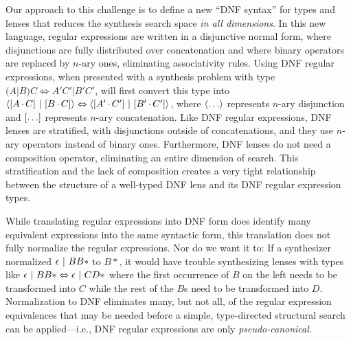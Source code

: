 \documentclass[acmsmall]{acmart}
\begin{document}
Our approach to this challenge is to define a new ``DNF syntax'' for types
and lenses that reduces the synthesis search space \emph{in all dimensions}.
In this new language, regular expressions are written in a disjunctive normal
form, where disjunctions are fully distributed over concatenation and where binary
operators are replaced by $n$-ary ones, eliminating associativity rules.
Using DNF regular expressions, when presented with a synthesis problem with type
$(A | B) C \Leftrightarrow A' C' | B' C'$, \Optician{} will first convert this
type into $\langle[ A \mkern-1mu\cdot\mkern-1mu C] ~|~ [ B
    \mkern-1mu\cdot\mkern-1mu C]\rangle \Leftrightarrow
\langle[ A' \mkern-1mu\cdot\mkern-1mu C'] ~|~ [ B' \mkern-1mu\cdot\mkern-1mu C']\rangle$, where
$\langle\ldots\rangle$ represents $n$-ary disjunction and $[\ldots]$
represents $n$-ary concatenation.
Like DNF regular expressions, DNF lenses are stratified, with disjunctions
outside of concatenations, and they use $n$-ary operators instead of binary
ones.  Furthermore, DNF lenses do not need a composition operator, eliminating
an entire dimension of search.  This stratification and the lack of
composition creates a very tight relationship between the structure of a well-typed
DNF lens and its DNF regular expression types.

While translating regular expressions into DNF form does identify many
equivalent expressions into the same syntactic form,
this translation does not fully normalize the regular expressions.
Nor do we want it to: If a synthesizer normalized $\epsilon ~|~ BB*$ to $B*$, it
would have trouble synthesizing lenses with types like $\epsilon ~|~ BB*
\Leftrightarrow \epsilon ~|~ CD*$
where the first occurrence of $B$ on the left needs to be transformed into
$C$ while the rest of the $B$s need to be transformed into $D$.
Normalization to DNF eliminates many, but not all, of the regular expression
equivalences that may be needed before a simple, type-directed structural search
can be applied---i.e., DNF regular expressions are only
\emph{pseudo-canonical}.
\end{document}
